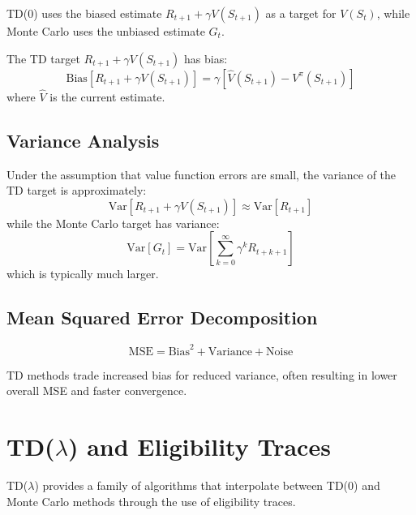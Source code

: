 TD(0) uses the biased estimate $R_{t+1} + \gamma V(S_{t+1})$ as a target for $V(S_t)$, while Monte Carlo uses the unbiased estimate $G_t$.

\begin{theorem}
The TD target $R_{t+1} + \gamma V(S_{t+1})$ has bias:
\begin{equation}
\text{Bias}[R_{t+1} + \gamma V(S_{t+1})] = \gamma[\hat{V}(S_{t+1}) - V^\pi(S_{t+1})]
\end{equation}
where $\hat{V}$ is the current estimate.
\end{theorem}

\subsection{Variance Analysis}

\begin{theorem}
Under the assumption that value function errors are small, the variance of the TD target is approximately:
\begin{equation}
\text{Var}[R_{t+1} + \gamma V(S_{t+1})] \approx \text{Var}[R_{t+1}]
\end{equation}
while the Monte Carlo target has variance:
\begin{equation}
\text{Var}[G_t] = \text{Var}\left[\sum_{k=0}^\infty \gamma^k R_{t+k+1}\right]
\end{equation}
which is typically much larger.
\end{theorem}

\subsection{Mean Squared Error Decomposition}

\begin{equation}
\text{MSE} = \text{Bias}^2 + \text{Variance} + \text{Noise}
\end{equation}

TD methods trade increased bias for reduced variance, often resulting in lower overall MSE and faster convergence.

\section{TD($\lambda$) and Eligibility Traces}

TD($\lambda$) provides a family of algorithms that interpolate between TD(0) and Monte Carlo methods through the use of eligibility traces.

